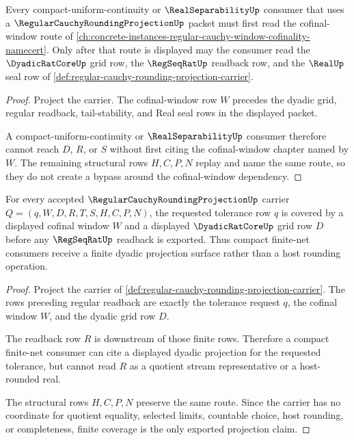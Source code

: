 \begin{theorem}
\label{thm:regular-cauchy-rounding-projection-cofinal-window-dependency}
Every compact-uniform-continuity or $\RealSeparabilityUp$ consumer that uses a $\RegularCauchyRoundingProjectionUp$ packet must first read the cofinal-window route of \autoref{ch:concrete-instances-regular-cauchy-window-cofinality-namecert}. Only after that route is displayed may the consumer read the $\DyadicRatCoreUp$ grid row, the $\RegSeqRatUp$ readback row, and the $\RealUp$ seal row of \autoref{def:regular-cauchy-rounding-projection-carrier}.
\end{theorem}
\begin{proof}
Project the carrier. The cofinal-window row $W$ precedes the dyadic grid, regular readback, tail-stability, and Real seal rows in the displayed packet.

A compact-uniform-continuity or $\RealSeparabilityUp$ consumer therefore cannot reach $D$, $R$, or $S$ without first citing the cofinal-window chapter named by $W$. The remaining structural rows $H,C,P,N$ replay and name the same route, so they do not create a bypass around the cofinal-window dependency.
\end{proof}

\begin{theorem}
\label{thm:regular-cauchy-rounding-projection-finite-coverage}
For every accepted $\RegularCauchyRoundingProjectionUp$ carrier $Q=(q,W,D,R,T,S,H,C,P,N)$, the requested tolerance row $q$ is covered by a displayed cofinal window $W$ and a displayed $\DyadicRatCoreUp$ grid row $D$ before any $\RegSeqRatUp$ readback is exported. Thus compact finite-net consumers receive a finite dyadic projection surface rather than a host rounding operation.
\end{theorem}
\begin{proof}
Project the carrier of \autoref{def:regular-cauchy-rounding-projection-carrier}. The rows preceding regular readback are exactly the tolerance request $q$, the cofinal window $W$, and the dyadic grid row $D$.

The readback row $R$ is downstream of those finite rows. Therefore a compact finite-net consumer can cite a displayed dyadic projection for the requested tolerance, but cannot read $R$ as a quotient stream representative or a host-rounded real.

The structural rows $H,C,P,N$ preserve the same route. Since the carrier has no coordinate for quotient equality, selected limits, countable choice, host rounding, or completeness, finite coverage is the only exported projection claim.
\end{proof}

